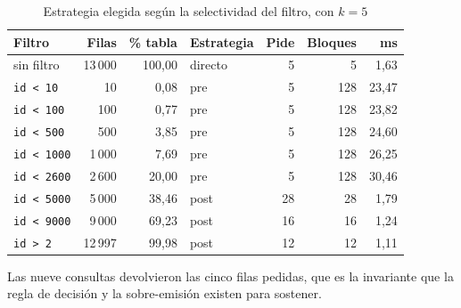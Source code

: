 \begin{table}[H]
\centering
\caption{Estrategia elegida según la selectividad del filtro, con $k = 5$}
\begin{tabular}{@{}lrrlrrr@{}}
\toprule
\textbf{Filtro} & \textbf{Filas} & \textbf{\% tabla} & \textbf{Estrategia} &
\textbf{Pide} & \textbf{Bloques} & \textbf{ms} \\
\midrule
sin filtro & 13\,000 & 100{,}00 & directo & 5 & 5 & 1{,}63 \\
\texttt{id \textless{} 10} & 10 & 0{,}08 & pre & 5 & 128 & 23{,}47 \\
\texttt{id \textless{} 100} & 100 & 0{,}77 & pre & 5 & 128 & 23{,}82 \\
\texttt{id \textless{} 500} & 500 & 3{,}85 & pre & 5 & 128 & 24{,}60 \\
\texttt{id \textless{} 1000} & 1\,000 & 7{,}69 & pre & 5 & 128 & 26{,}25 \\
\texttt{id \textless{} 2600} & 2\,600 & 20{,}00 & pre & 5 & 128 & 30{,}46 \\
\texttt{id \textless{} 5000} & 5\,000 & 38{,}46 & post & 28 & 28 & 1{,}79 \\
\texttt{id \textless{} 9000} & 9\,000 & 69{,}23 & post & 16 & 16 & 1{,}24 \\
\texttt{id \textgreater{} 2} & 12\,997 & 99{,}98 & post & 12 & 12 & 1{,}11 \\
\bottomrule
\end{tabular}
\end{table}

Las nueve consultas devolvieron las cinco filas pedidas, que es la invariante
que la regla de decisión y la sobre-emisión existen para sostener.


